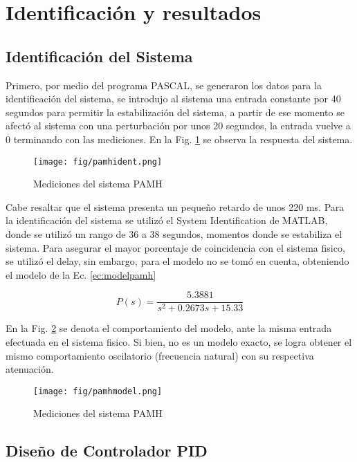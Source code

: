 \documentclass[conference,onecolumn,12pt]{IEEEtran}
\numberwithin{equation}{subsection}
\begin{document}
\section{Identificación y resultados}

\subsection{Identificación del Sistema}

Primero, por medio del programa PASCAL, se generaron los datos para la identificación del sistema, se introdujo al sistema una entrada constante por 40 segundos para permitir la estabilización del sistema, a partir de ese momento se afectó al sistema con una perturbación por unos 20 segundos, la entrada vuelve a 0 terminando con las mediciones. En la Fig. \ref{fig:pamhident} se observa la respuesta del sistema.

\begin{figure}[htbp]
    \centering
    \texttt{[image: fig/pamhident.png]}
    \caption{Mediciones del sistema PAMH}
    \label{fig:pamhident}
\end{figure}

Cabe resaltar que el sistema presenta un pequeño retardo de unos 220 ms. Para la identificación del sistema se utilizó el System Identification de MATLAB, donde se utilizó un rango de 36 a 38 segundos, momentos donde se estabiliza el sistema. Para asegurar el mayor porcentaje de coincidencia con el sistema fisico, se utilizó el delay, sin embargo, para el modelo no se tomó en cuenta, obteniendo el modelo de la Ec. \ref{ec:modelpamh}

\begin{equation}
    P(s) = \frac{5.3881}{s^2 + 0.2673s + 15.33}
    \label{ec:modelpamh}
\end{equation}

En la Fig. \ref{fig:pamhmodel} se denota el comportamiento del modelo, ante la misma entrada efectuada en el sistema fisico. Si bien, no es un modelo exacto, se logra obtener el mismo comportamiento oscilatorio (frecuencia natural) con su respectiva atenuación.

\begin{figure}[htbp]
    \centering
    \texttt{[image: fig/pamhmodel.png]}
    \caption{Mediciones del sistema PAMH}
    \label{fig:pamhmodel}
\end{figure}

\subsection{Diseño de Controlador PID}
\end{document}
